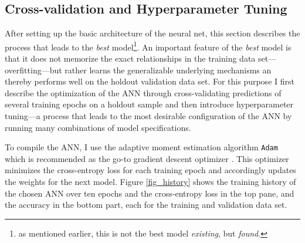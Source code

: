 \documentclass[12pt,a4paper]{article}
\let\code=\texttt
\begin{document}
\subsection{Cross-validation and Hyperparameter Tuning} \label{sec_crossval}
After setting up the basic architecture of the neural net, this section describes the process that leads to the \textit{best} model\footnote{as mentioned earlier, this is not the best model \textit{existing}, but \textit{found}.}.
An important feature of the \textit{best} model is that it does not memorize the exact relationships in the training data set---overfitting---but
rather learns the generalizable underlying mechanisms an thereby performs well on the holdout validation data set. 
For this purpose I first describe the optimization of the ANN through cross-validating predictions of several training epochs on a holdout 
sample and then introduce hyperparameter tuning---a process that leads to the most desirable configuration of the ANN by
running many combinations of model specifications.

To compile the ANN, I use the adaptive moment estimation algorithm \code{Adam} \citep{kingmaAdamMethodStochastic2014}
which is recommended as the go-to gradient descent optimizer \citep{ruderOverviewGradientDescent2016}.
This optimizer minimizes the cross-entropy loss \citep{zhangGeneralizedCrossEntropy2018} for each training epoch and accordingly updates the weights
for the next model.
Figure \ref{fig_history} shows the training history of the chosen ANN over ten epochs and the cross-entropy loss in the top pane, and the accuracy
in the bottom part, each for the training and validation data set.
\end{document}
